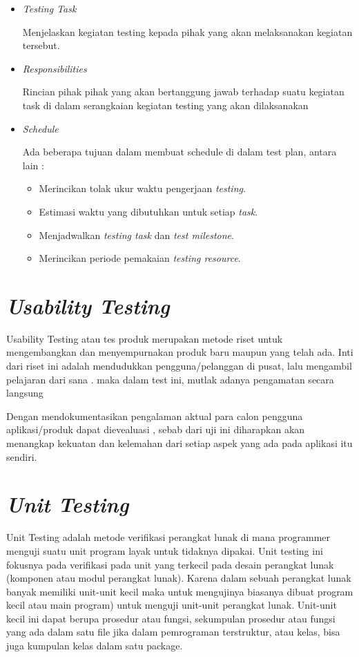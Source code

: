 \begin{itemize}
	
	\item \textit{Testing Task}
	\par Menjelaskan kegiatan testing kepada pihak yang akan melaksanakan kegiatan tersebut.
	
	\item \textit{Responsibilities}
	\par Rincian pihak pihak yang akan bertanggung jawab terhadap suatu kegiatan task di dalam serangkaian kegiatan testing yang akan dilaksanakan
	
	\item \textit{Schedule}
	\par Ada beberapa tujuan dalam membuat schedule di dalam test plan, antara lain :
	\begin{itemize}
		\itemsep0em
		\item Merincikan tolak ukur waktu pengerjaan \textit{testing}.
		\item Estimasi waktu yang dibutuhkan untuk setiap \textit{task}.
		\item Menjadwalkan \textit{testing task} dan \textit{test milestone}.
		\item Merincikan periode pemakaian \textit{testing resource}. 
		\citep{Shanardi}
	\end{itemize}
\end{itemize}

\section {\textit{Usability Testing}}
\par Usability Testing atau tes produk merupakan metode riset untuk mengembangkan dan menyempurnakan produk baru maupun yang telah ada. Inti dari riset ini adalah mendudukkan pengguna/pelanggan di pusat, lalu mengambil pelajaran dari sana . maka dalam test ini, mutlak adanya pengamatan secara langsung \citep{nielsen2012}
\par Dengan mendokumentasikan pengalaman aktual para calon pengguna aplikasi/produk dapat dievealuasi , sebab dari uji ini diharapkan akan menangkap kekuatan dan kelemahan dari setiap aspek yang ada pada aplikasi itu sendiri.

\section {\textit{Unit Testing}}
Unit Testing adalah metode verifikasi perangkat lunak di mana programmer menguji suatu unit program layak untuk tidaknya dipakai. Unit testing ini fokusnya pada verifikasi pada unit yang terkecil pada desain perangkat lunak (komponen atau modul perangkat lunak). Karena dalam sebuah perangkat lunak banyak memiliki unit-unit kecil maka untuk mengujinya biasanya dibuat program kecil atau main program) untuk menguji unit-unit perangkat lunak. Unit-unit kecil ini dapat berupa prosedur atau fungsi, sekumpulan prosedur atau fungsi yang ada dalam satu file jika dalam pemrograman terstruktur, atau kelas, bisa juga kumpulan kelas dalam satu package. \citep{feridi}

